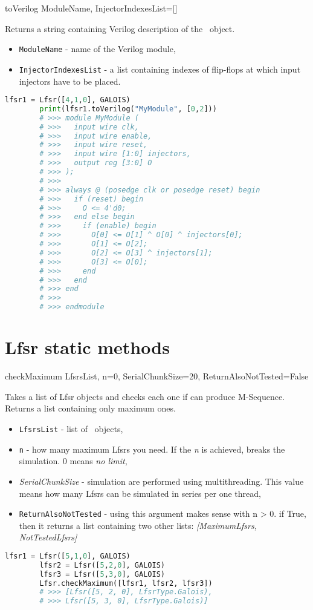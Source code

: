  {toVerilog} {ModuleName, InjectorIndexesList=[]} {
	Returns a string containing Verilog description of the \Lfsr\ object.
	\begin{itemize}
		\item \texttt{ModuleName} - name of the Verilog module,
		\item \texttt{InjectorIndexesList} - a list containing indexes of flip-flops at which input injectors have to be placed.
	\end{itemize}
}
\begin{lstlisting}[language=Python]
		lfsr1 = Lfsr([4,1,0], GALOIS)
		print(lfsr1.toVerilog("MyModule", [0,2]))
		# >>> module MyModule (
		# >>>   input wire clk,
		# >>>   input wire enable,
		# >>>   input wire reset,
		# >>>   input wire [1:0] injectors,
		# >>>   output reg [3:0] O
		# >>> );
		# >>> 
		# >>> always @ (posedge clk or posedge reset) begin
		# >>>   if (reset) begin
		# >>>     O <= 4'd0;
		# >>>   end else begin
		# >>>     if (enable) begin
		# >>>       O[0] <= O[1] ^ O[0] ^ injectors[0];
		# >>>       O[1] <= O[2];
		# >>>       O[2] <= O[3] ^ injectors[1];
		# >>>       O[3] <= O[0];
		# >>>     end
		# >>>   end
		# >>> end
		# >>> 
		# >>> endmodule
\end{lstlisting}

\section{Lfsr static methods}

 {checkMaximum} {LfsrsList, n=0, SerialChunkSize=20, ReturnAlsoNotTested=False} {
	Takes a list of Lfsr objects and checks each one if can produce M-Sequence. Returns a list containing only maximum ones.
	\begin{itemize}
		\item \texttt{LfsrsList} - list of \Lfsr\ objects,
		\item \texttt{n} - how many maximum Lfsrs you need. If the \textit{n} is achieved, breaks the simulation. 0 means \textit{no limit},
		\item \textit{SerialChunkSize} - simulation are performed using multithreading. This value means how many Lfsrs can be simulated in series per one thread,
		\item \texttt{ReturnAlsoNotTested} - using this argument makes sense with n > 0. if True, then it returns a list containing two other lists: \textit{[MaximumLfsrs, NotTestedLfsrs]}
	\end{itemize}
}
\begin{lstlisting}[language=Python]
		lfsr1 = Lfsr([5,1,0], GALOIS)
		lfsr2 = Lfsr([5,2,0], GALOIS)
		lfsr3 = Lfsr([5,3,0], GALOIS)
		Lfsr.checkMaximum([lfsr1, lfsr2, lfsr3])
		# >>> [Lfsr([5, 2, 0], LfsrType.Galois), 
		# >>> Lfsr([5, 3, 0], LfsrType.Galois)]
\end{lstlisting}

